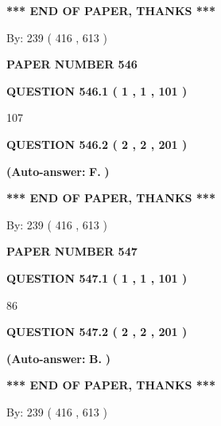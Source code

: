 \documentclass{ctexart}
\begin{document}
 
   
   
   
   
\vspace{1.0in} 
{\textbf{\large{ *** END OF PAPER, THANKS *** }}} 
   
   
\hspace{1.0in} By: 
 239 ( 416 ,  613 )
   
   
   
   
\newpage 
\setcounter{page}{ 
   546001 } 
   
   
 {\textbf{ \Large{ PAPER NUMBER  546  }}}
   
   
   
   
  
  
{\textbf{\large{QUESTION
546.1 
 ( 1 , 1 , 101 )
}}}

107
  
  
{\textbf{\large{QUESTION
546.2 
 ( 2 , 2 , 201 )
}}}
 
 
{\textbf{(Auto-answer:}}
{\textbf{\large{
F.}}}
{\textbf{)}}
 
 
   
   
   
   
\vspace{1.0in} 
{\textbf{\large{ *** END OF PAPER, THANKS *** }}} 
   
   
\hspace{1.0in} By: 
 239 ( 416 ,  613 )
   
   
   
   
\newpage 
\setcounter{page}{ 
   547001 } 
   
   
 {\textbf{ \Large{ PAPER NUMBER  547  }}}
   
   
   
   
  
  
{\textbf{\large{QUESTION
547.1 
 ( 1 , 1 , 101 )
}}}

86
  
  
{\textbf{\large{QUESTION
547.2 
 ( 2 , 2 , 201 )
}}}
 
 
{\textbf{(Auto-answer:}}
{\textbf{\large{
B.}}}
{\textbf{)}}
 
 
   
   
   
   
\vspace{1.0in} 
{\textbf{\large{ *** END OF PAPER, THANKS *** }}} 
   
   
\hspace{1.0in} By: 
 239 ( 416 ,  613 )
   
   
   
   
\newpage 
\setcounter{page}{ 
   548001 } 
   
\end{document}
